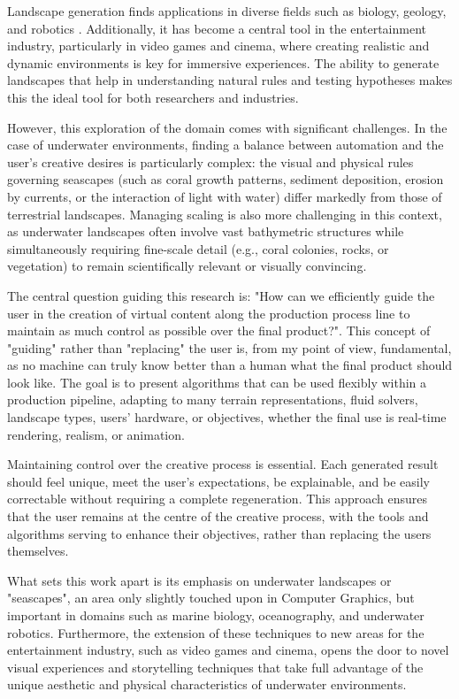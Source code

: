 Landscape generation finds applications in diverse fields such as biology, geology, and robotics \cite{Tzachor2023,Chen2023,Gerigk2025,Rudin2022}. Additionally, it has become a central tool in the entertainment industry, particularly in video games and cinema, where creating realistic and dynamic environments is key for immersive experiences. The ability to generate landscapes that help in understanding natural rules and testing hypotheses makes this the ideal tool for both researchers and industries.

However, this exploration of the domain comes with significant challenges. In the case of underwater environments, finding a balance between automation and the user's creative desires is particularly complex: the visual and physical rules governing seascapes (such as coral growth patterns, sediment deposition, erosion by currents, or the interaction of light with water) differ markedly from those of terrestrial landscapes. Managing scaling is also more challenging in this context, as underwater landscapes often involve vast bathymetric structures while simultaneously requiring fine-scale detail (e.g., coral colonies, rocks, or vegetation) to remain scientifically relevant or visually convincing.

The central question guiding this research is: "How can we efficiently guide the user in the creation of virtual content along the production process line to maintain as much control as possible over the final product?". This concept of "guiding" rather than "replacing" the user is, from my point of view, fundamental, as no machine can truly know better than a human what the final product should look like. The goal is to present algorithms that can be used flexibly within a production pipeline, adapting to many terrain representations, fluid solvers, landscape types, users' hardware, or objectives, whether the final use is real-time rendering, realism, or animation.

Maintaining control over the creative process is essential. Each generated result should feel unique, meet the user's expectations, be explainable, and be easily correctable without requiring a complete regeneration. This approach ensures that the user remains at the centre of the creative process, with the tools and algorithms serving to enhance their objectives, rather than replacing the users themselves.

What sets this work apart is its emphasis on underwater landscapes or "seascapes", an area only slightly touched upon in Computer Graphics, but important in domains such as marine biology, oceanography, and underwater robotics. Furthermore, the extension of these techniques to new areas for the entertainment industry, such as video games and cinema, opens the door to novel visual experiences and storytelling techniques that take full advantage of the unique aesthetic and physical characteristics of underwater environments.




